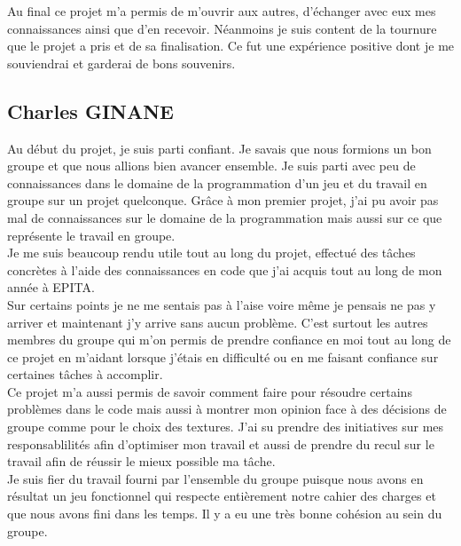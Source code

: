 \documentclass[a4paper , 12pt]{article}
\begin{document}
Au final ce projet m’a permis de m’ouvrir aux autres, d’échanger avec eux mes connaissances ainsi que d’en recevoir. Néanmoins je suis content de la tournure que le projet a pris et de sa finalisation. Ce fut une expérience positive dont je me souviendrai et garderai de bons souvenirs.

\newpage

\subsection{Charles GINANE}

\quad

Au début du projet, je suis parti confiant. Je savais que nous formions un bon groupe et que nous allions bien avancer ensemble. Je suis parti avec peu de connaissances dans le domaine de la programmation d’un jeu et du travail en groupe sur un projet quelconque. 
Grâce à mon premier projet, j’ai pu avoir pas mal de connaissances sur le domaine de la programmation mais aussi sur ce que représente le travail en groupe.\\


Je me suis beaucoup rendu utile tout au long du projet, effectué des tâches concrètes à l’aide des connaissances en code que j’ai acquis tout au long de mon année à EPITA.\\


Sur certains points je ne me sentais pas à l’aise voire même je pensais ne pas y arriver et maintenant j’y arrive sans aucun problème. C’est surtout les autres membres du groupe qui m’on permis de prendre confiance en moi tout au long de ce projet en m’aidant lorsque j’étais en difficulté ou en me faisant confiance sur certaines tâches à accomplir. \\


Ce projet m’a aussi permis de savoir comment faire pour résoudre certains problèmes dans le code mais aussi à montrer mon opinion face à des décisions de groupe comme pour le choix des textures. 
J’ai su prendre des initiatives sur mes responsablilités afin d’optimiser mon travail et aussi de prendre du recul sur le travail afin de réussir le mieux possible ma tâche.\\

Je suis fier du travail fourni par l’ensemble du groupe puisque nous avons en résultat un jeu fonctionnel qui respecte entièrement notre cahier des charges et que nous avons fini dans les temps. Il y a eu une très bonne cohésion au sein du groupe.\\
\end{document}
